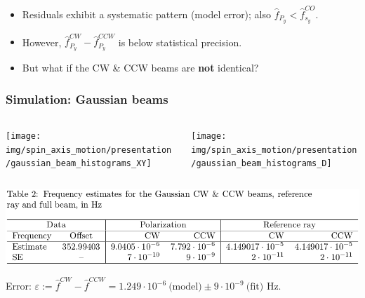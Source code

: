\documentclass{beamer}
\begin{document}
\begin{frame}
  \begin{itemize}
    \item Residuals exhibit a systematic pattern (model error); also $\hat f_{P_y} < \hat f_{s_y}^{CO}$.
    \item However, $\hat f_{P_y}^{CW} - \hat f_{P_y}^{CCW}$ is below statistical precision.
    \item But what if the CW \& CCW beams are \textbf{not} identical?
  \end{itemize}
\end{frame}


\begin{frame}
  \frametitle{Simulation: Gaussian beams}
  \vspace*{-.8cm}
  \begin{columns}
    \begin{column}{.5\textwidth}
      \begin{center}
        \texttt{[image: img/spin\_axis\_motion/presentation/gaussian\_beam\_histograms\_XY]}
      \end{center}
    \end{column}
    \begin{column}{.5\textwidth}
      \begin{center}
        \texttt{[image: img/spin\_axis\_motion/presentation/gaussian\_beam\_histograms\_D]}
      \end{center}
    \end{column}
  \end{columns}
  \vspace*{-.2cm}
  \begin{center}
    \includegraphics[height=.25\paperheight]{img/spin_axis_motion/presentation/gauss_beam_table}
  \end{center}
  \vspace*{-.3cm}
    Error: $\varepsilon := \hat f^{CW} - \hat f^{CCW} = 1.249\cdot 10^{-6}~\text{(model)} \pm 9\cdot 10^{-9}~\text{(fit)}$ Hz.
\end{frame}
\end{document}
